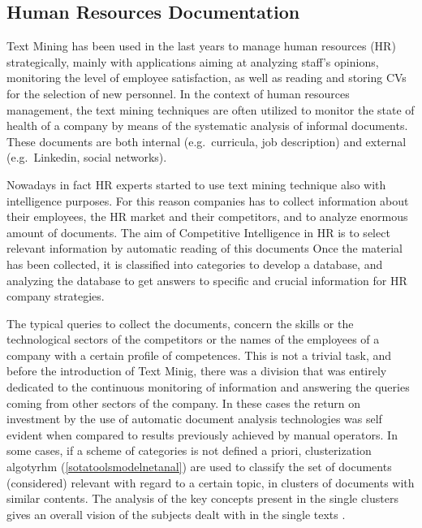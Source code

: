 \documentclass[]{book}
\begin{document}
\subsection{Human Resources Documentation}\label{sotadocumentsjobs}

Text Mining has been used in the last years to manage human resources
(HR) strategically, mainly with applications aiming at analyzing staff's
opinions, monitoring the level of employee satisfaction, as well as
reading and storing CVs for the selection of new personnel. In the
context of human resources management, the text mining techniques are
often utilized to monitor the state of health of a company by means of
the systematic analysis of informal documents. These documents are both
internal (e.g.~curricula, job description) and external (e.g.~Linkedin,
social networks).

Nowadays in fact HR experts started to use text mining technique also
with intelligence purposes. For this reason companies has to collect
information about their employees, the HR market and their competitors,
and to analyze enormous amount of documents. The aim of Competitive
Intelligence in HR \citep{bolasco2005understanding} is to select
relevant information by automatic reading of this documents Once the
material has been collected, it is classified into categories to develop
a database, and analyzing the database to get answers to specific and
crucial information for HR company strategies.

The typical queries to collect the documents, concern the skills or the
technological sectors of the competitors or the names of the employees
of a company with a certain profile of competences. This is not a
trivial task, and before the introduction of Text Minig, there was a
division that was entirely dedicated to the continuous monitoring of
information and answering the queries coming from other sectors of the
company. In these cases the return on investment by the use of automatic
document analysis technologies was self evident when compared to results
previously achieved by manual operators. In some cases, if a scheme of
categories is not defined a priori, clusterization algotyrhm
(\ref{sotatoolsmodelnetanal}) are used to classify the set of documents
(considered) relevant with regard to a certain topic, in clusters of
documents with similar contents. The analysis of the key concepts
present in the single clusters gives an overall vision of the subjects
dealt with in the single texts \citep{gupta2009survey}.
\end{document}
